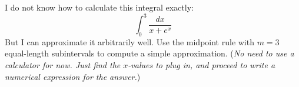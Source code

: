 I do not know how to calculate this integral exactly:
  $$\int_0^3 \frac{dx}{x + e^x}$$
But I can approximate it arbitrarily well.  Use the midpoint rule with $m=3$ equal-length subintervals to compute a simple approximation.  (\emph{No need to use a calculator for now.  Just find the $x$-values to plug in, and proceed to write a numerical expression for the answer.})
